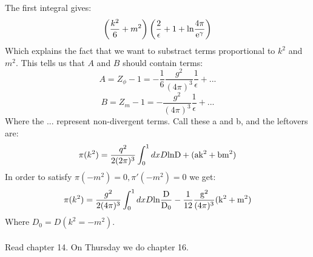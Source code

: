 \documentclass[12 pt]{article}
\begin{document}
The first integral gives:
\[  \left( \frac{k^2}{6} + m^2 \right) \left( \frac{2}{\epsilon} + 1 + \rm{ln} \frac{4\pi}{e^{\gamma}} \right) \]
Which explains the fact that we want to substract terms proportional to $k^2$ and $m^2$. This tells us that $A$ and $B$ should contain terms:
\[   A = Z_{\phi} - 1 = - \frac{1}{6} \frac{g^2}{(4\pi)^3} \frac{1}{\epsilon} + ...    \]
\[   B = Z_m - 1  = - \frac{g^2}{(4\pi)^3} \frac{1}{\epsilon} + ...        \]
Where the $...$ represent non-divergent terms. Call these a and b, and the leftovers are:
\[   \pi(k^2) = \frac{q^2}{2 (2\pi)^3} \int_0^1 dx D \rm{ln}D  + (ak^2 + bm^2)    \]
In order to satisfy $\pi(-m^2) = 0 , \pi'(-m^2) = 0$ we get:
\[   \pi(k^2)   = \frac{g^2}{2(4\pi)^3} \int_0^1 dx D \rm{ln} \frac{D}{D_0}  -  \frac{1}{12} \frac{g^2}{(4\pi)^3} (k^2 + m^2)  \]
Where $D_0 = D(k^2 = -m^2)$.
\\
\\
Read chapter 14. On Thursday we do chapter 16.
\end{document}
